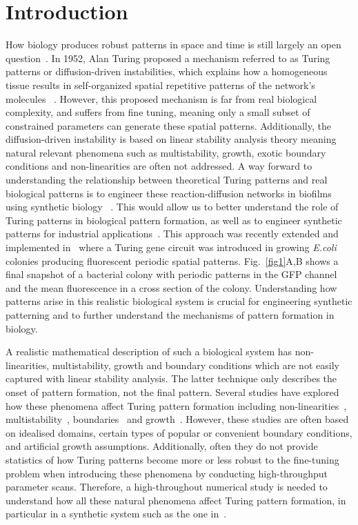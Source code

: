 \section{Introduction}

How biology produces robust patterns in space and time is still largely an open question~\parencite{scholes2017three}.
In 1952, Alan Turing proposed a mechanism referred to as Turing patterns or diffusion-driven instabilities, which explains how a homogeneous tissue results in self-organized spatial repetitive patterns of the network’s molecules ~\parencite{Turing1952, Gierer1972}.
However, this proposed mechanism is far from real biological complexity, and suffers from fine tuning, meaning only a small subset of constrained parameters can generate these spatial patterns.
Additionally, the diffusion-driven instability is based on linear stability analysis theory meaning natural relevant phenomena such as multistability, growth, exotic boundary conditions and non-linearities are often not addressed.
A way forward to understanding the relationship between theoretical Turing patterns and real biological patterns is to engineer these reaction-diffusion networks in biofilms using synthetic biology ~\parencite{Sekine2018, Karig2018}.
This would allow us to better understand the role of Turing patterns in biological pattern formation, as well as to engineer synthetic patterns for industrial applications~\parencite{cao2017programmable, tan2018polyamide,din2020interfacing}.
This approach was recently extended and implemented in~\cite{Oliver2023} where a Turing gene circuit was introduced in growing \textit{E.coli} colonies producing fluorescent periodic spatial patterns. Fig.~\ref{fig1}A,B shows a final snapshot of a bacterial colony with periodic patterns in the GFP channel and the mean fluorescence in a cross section of the colony.
Understanding how patterns arise in this realistic biological system is crucial for engineering synthetic patterning and to further understand the mechanisms of pattern formation in biology.

A realistic mathematical description of such a biological system has non-linearities, multistability, growth and boundary conditions which are not easily captured with linear stability analysis. The latter technique only describes the onset of pattern formation, not the final pattern.
Several studies have explored how these phenomena affect Turing pattern formation including non-linearities~\parencite{ermentrout1991stripes}, multistability~\parencite{Krause2023}, boundaries~\parencite{Arcuri1986,Maini1993, Maini1997,Krause2020, Krause2021, Woolley2022} and growth~\parencite{gaffney2010, Klika2017, Krause2019}.
However, these studies are often based on idealised domains, certain types of popular or convenient boundary conditions, and artificial growth assumptions.
Additionally, often they do not provide statistics of how Turing patterns become more or less robust to the fine-tuning problem when introducing these phenomena by conducting high-throughput parameter scans.
Therefore, a high-throughout numerical study is needed to understand how all these natural phenomena affect Turing pattern formation, in particular in a synthetic system such as the one in~\cite{Oliver2023}.

